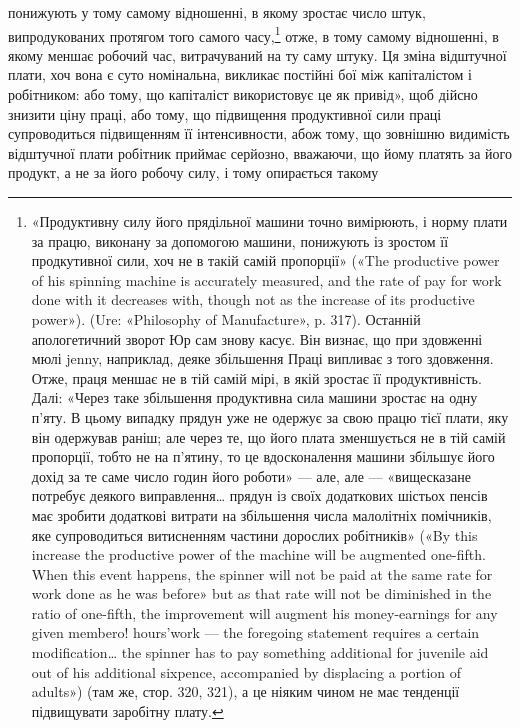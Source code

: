 \parcont{}  %
понижують у тому самому відношенні, в якому зростає число
штук, випродукованих протягом того самого часу,\footnote{
«Продуктивну силу його прядільної машини точно вимірюють,
і норму плати за працю, виконану за допомогою машини, понижують
із зростом її продкутивної сили, хоч не в такій самій пропорції» («The
productive power of his spinning machine is accurately measured, and the
rate of pay for work done with it decreases with, though not as the increase
of its productive power»). (Ure: «Philosophy of Manufacture», p. 317).
Останній апологетичний зворот Юр сам знову касує. Він визнає, що при
здовженні мюлі jenny, наприклад, деяке збільшення Праці випливає
з того здовження. Отже, праця меншає не в тій самій мірі, в якій зростає
її продуктивність. Далі: «Через таке збільшення продуктивна сила машини
зростає на одну п’яту. В цьому випадку прядун уже не одержує
за свою працю тієї плати, яку він одержував раніш; але через те, що його
плата зменшується не в тій самій пропорції, тобто не на п’ятину, то це
вдосконалення машини збільшує його дохід за те саме число годин його
роботи» — але, але — «вищесказане потребує деякого виправлення\dots{}
прядун із своїх додаткових шістьох пенсів має зробити додаткові витрати
на збільшення числа малолітніх помічників, яке супроводиться витисненням
частини дорослих робітників» («By this increase the productive power
of the machine will be augmented one-fifth. When this event happens,
the spinner will not be paid at the same rate for work done as he was before»
but as that rate will not be diminished in the ratio of one-fifth, the improvement
will augment his money-earnings for any given membero! hours’work
— the foregoing statement requires a certain modification\dots{} the spinner
has to pay something additional for juvenile aid out of his additional
sixpence, accompanied by displacing a portion of adults») (там же, стор. 320,
321), а це ніяким чином не має тенденції підвищувати заробітну плату.
} отже, в тому
самому відношенні, в якому меншає робочий час, витрачуваний
на ту саму штуку. Ця зміна відштучної плати, хоч вона є суто
номінальна, викликає постійні бої між капіталістом і робітником:
або тому, що капіталіст використовує це як привід»,
щоб дійсно знизити ціну праці, або тому, що підвищення продуктивної
сили праці супроводиться підвищенням її інтенсивности,
абож тому, що зовнішню видимість відштучної плати
робітник приймає серйозно, вважаючи, що йому платять за його
продукт, а не за його робочу силу, і тому опирається такому
